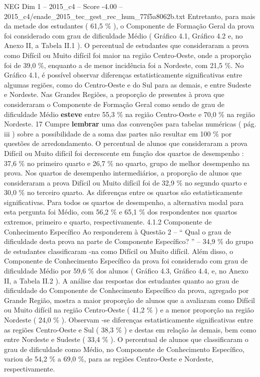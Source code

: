 \begin{textsample}{NEG Dim 1 – 2015\_c4 – Score -4.00 – 2015\_c4/enade\_2015\_tec\_gest\_rec\_hum\_77f5a8062b.txt}
Entretanto, para mais da metade dos estudantes ( 61,5 \% ), o Componente de Formação Geral da prova foi considerado com grau de dificuldade Médio ( Gráfico 4.1, Gráfico 4.2 e, no Anexo II, a Tabela II.1 ).
O percentual de estudantes que consideraram a prova como Difícil ou Muito difícil foi maior na região Centro-Oeste, onde a proporção foi de 39,0 \%, enquanto a de menor incidência foi a Nordeste, com 21,5 \%.
No Gráfico 4.1, é possível observar diferenças estatisticamente significativas entre algumas regiões, como do Centro-Oeste e do Sul para as demais, e entre Sudeste e Nordeste.
Nas Grandes Regiões, a proporção de presentes à prova que consideraram o Componente de Formação Geral como sendo de grau de dificuldade Médio \textbf{esteve} entre 55,3 \% na região Centro-Oeste e 70,0 \% na região Nordeste. 17 Cumpre \textbf{lembrar} uma das convenções para tabelas numéricas ( pág. iii ) sobre a possibilidade de a soma das partes não resultar em 100 \% por questões de arredondamento.
O percentual de alunos que consideraram a prova Difícil ou Muito difícil foi decrescente em função dos quartos de desempenho : 37,6 \% no primeiro quarto e 26,7 \% no quarto, grupo de melhor desempenho na prova.
Nos quartos de desempenho intermediários, a proporção de alunos que consideraram a prova Difícil ou Muito difícil foi de 32,9 \% no segundo quarto e 30,0 \% no terceiro quarto.
As diferenças entre os quartos são estatisticamente significativas.
Para todos os quartos de desempenho, a alternativa modal para esta pergunta foi Médio, com 56,2 \% e 65,1 \% dos respondentes nos quartos extremos, primeiro e quarto, respectivamente. 4.1.2 Componente de Conhecimento Específico Ao responderem à Questão 2 – “ Qual o grau de dificuldade desta prova na parte de Componente Específico? ” – 34,9 \% do grupo de estudantes classificaram -na como Difícil ou Muito difícil.
Além disso, o Componente de Conhecimento Específico da prova foi considerado com grau de dificuldade Médio por 59,6 \% dos alunos ( Gráfico 4.3, Gráfico 4.4, e, no Anexo II, a Tabela II.2 ).
A análise das respostas dos estudantes quanto ao grau de dificuldade do Componente de Conhecimento Específico da prova, agregado por Grande Região, mostra a maior proporção de alunos que a avaliaram como Difícil ou Muito difícil na região Centro-Oeste ( 41,2 \% ) e a menor proporção na região Nordeste ( 24,0 \% ).
Observam -se diferenças estatisticamente significativas entre as regiões Centro-Oeste e Sul ( 38,3 \% ) e destas em relação às demais, bem como entre Nordeste e Sudeste ( 33,4 \% ).
O percentual de alunos que classificaram o grau de dificuldade como Médio, no Componente de Conhecimento Específico, variou de 54,2 \% a 69,0 \%, para as regiões Centro-Oeste e Nordeste, respectivamente.

\end{textsample}
